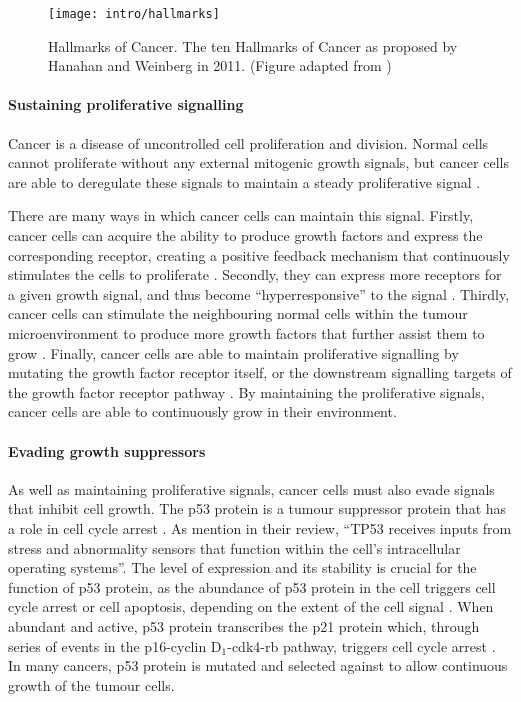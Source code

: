\begin{figure}[htb!]
	\centering
	\texttt{[image: intro/hallmarks]}
	\caption[Hallmarks of Cancer]{Hallmarks of Cancer. The ten Hallmarks of Cancer as proposed by Hanahan and Weinberg in 2011. (Figure adapted from \citet{Hanahan2011})}
	\label{fig:hallmarks}
\end{figure}

\paragraph{Sustaining proliferative signalling}

\noindent
Cancer is a disease of uncontrolled cell proliferation and division.
Normal cells cannot proliferate without any external mitogenic growth signals, but cancer cells are able to deregulate these signals to maintain a steady proliferative signal \citep{Hanahan2011}.

There are many ways in which cancer cells can maintain this signal.
Firstly, cancer cells can acquire the ability to produce growth factors and express the corresponding receptor, creating a positive feedback mechanism that continuously stimulates the cells to proliferate \citep{Hanahan2000}.
Secondly, they can express more receptors for a given growth signal, and thus become ``hyperresponsive'' to the signal \citep{Hanahan2000,Hanahan2011}.
Thirdly, cancer cells can stimulate the neighbouring normal cells within the tumour microenvironment to produce more growth factors that further assist them to grow \citep{Bhowmick2004, Liotta2001, Wiseman2002}.
Finally, cancer cells are able to maintain proliferative signalling by mutating the growth factor receptor itself, or the downstream signalling targets of the growth factor receptor pathway \citep{Fuqua1991,SuHuang1997,Satyamoorthy2003}.
By maintaining the proliferative signals, cancer cells are able to continuously grow in their environment.

\paragraph{Evading growth suppressors}

\noindent
As well as maintaining proliferative signals, cancer cells must also evade signals that inhibit cell growth.
The p53 protein is a tumour suppressor protein that has a  role in cell cycle arrest \citep{Hanahan2011,Levine1997}.
As \citet{Hanahan2011} mention in their review, ``TP53 receives inputs from stress and abnormality sensors that function within the cell's intracellular operating systems''.
The level of expression and its stability is crucial for the function of p53 protein, as the abundance of p53 protein in the cell triggers cell cycle arrest or cell \gls{apoptosis}, depending on the extent of the cell signal \citep{Fridman2003,Hanahan2011,Levine1997}.
When abundant and active, p53 protein transcribes the p21 protein which, through series of events in the p16-cyclin D$_1$-cdk4-\gls{rb} pathway, triggers cell cycle arrest \citep{Levine1997}.
In many cancers, p53 protein is mutated and selected against to allow continuous growth of the tumour cells.

